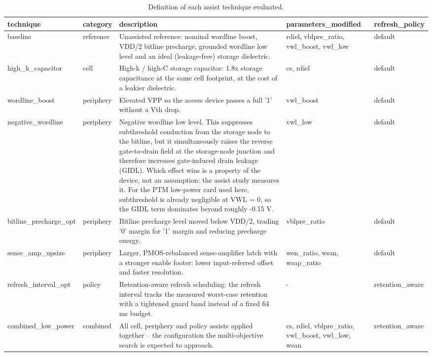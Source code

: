 \begin{table}[!t]
\centering
\caption{Definition of each assist technique evaluated.}
\label{tab:assist_technique_definitions}
\footnotesize
\begin{tabular}{lllll}
\toprule
technique & category & description & parameters\_modified & refresh\_policy \\
\midrule
baseline & reference & Unassisted reference: nominal wordline boost, VDD/2 bitline precharge, grounded wordline low level and an ideal (leakage-free) storage dielectric. & rdiel, vblpre\_ratio, vwl\_boost, vwl\_low & default \\
high\_k\_capacitor & cell & High-k / high-C storage capacitor: 1.8x storage capacitance at the same cell footprint, at the cost of a leakier dielectric. & cs, rdiel & default \\
wordline\_boost & periphery & Elevated VPP so the access device passes a full '1' without a Vth drop. & vwl\_boost & default \\
negative\_wordline & periphery & Negative wordline low level. This suppresses subthreshold conduction from the storage node to the bitline, but it simultaneously raises the reverse gate-to-drain field at the storage-node junction and therefore increases gate-induced drain leakage (GIDL). Which effect wins is a property of the device, not an assumption: the assist study measures it. For the PTM low-power card used here, subthreshold is already negligible at VWL = 0, so the GIDL term dominates beyond roughly -0.15 V. & vwl\_low & default \\
bitline\_precharge\_opt & periphery & Bitline precharge level moved below VDD/2, trading '0' margin for '1' margin and reducing precharge energy. & vblpre\_ratio & default \\
sense\_amp\_upsize & periphery & Larger, PMOS-rebalanced sense-amplifier latch with a stronger enable footer: lower input-referred offset and faster resolution. & wen\_ratio, wsan, wsap\_ratio & default \\
refresh\_interval\_opt & policy & Retention-aware refresh scheduling: the refresh interval tracks the measured worst-case retention with a tightened guard band instead of a fixed 64 ms budget. & - & retention\_aware \\
combined\_low\_power & combined & All cell, periphery and policy assists applied together -- the configuration the multi-objective search is expected to approach. & cs, rdiel, vblpre\_ratio, vwl\_boost, vwl\_low, wsan & retention\_aware \\
\bottomrule
\end{tabular}
\end{table}

